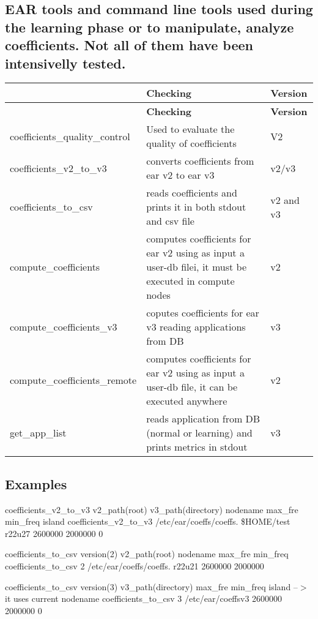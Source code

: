 \subsection*{E\+AR tools and command line tools used during the learning phase or to manipulate, analyze coefficients. Not all of them have been intensivelly tested. }

\tabulinesep=1mm
\begin{longtabu} spread 0pt [c]{*3{|X[-1]}|}
\hline
{}&{\bf Checking }&{\bf Version  }\\
\endfirsthead
\hline
\endfoot
\hline
{}&{\bf Checking }&{\bf Version  }\\
\endhead
coefficients\+\_\+quality\+\_\+control &Used to evaluate the quality of coefficients &V2 \\
coefficients\+\_\+v2\+\_\+to\+\_\+v3 &converts coefficients from ear v2 to ear v3 &v2/v3 \\
coefficients\+\_\+to\+\_\+csv &reads coefficients and prints it in both stdout and csv file &v2 and v3 \\
compute\+\_\+coefficients &computes coefficients for ear v2 using as input a user-\/db filei, it must be executed in compute nodes &v2 \\
compute\+\_\+coefficients\+\_\+v3 &coputes coefficients for ear v3 reading applications from DB &v3 \\
compute\+\_\+coefficients\+\_\+remote &computes coefficients for ear v2 using as input a user-\/db file, it can be executed anywhere &v2 \\
get\+\_\+app\+\_\+list &reads application from DB (normal or learning) and prints metrics in stdout &v3 \\
\end{longtabu}
\subsection*{Examples }


\begin{DoxyItemize}
\item coefficients\+\_\+v2\+\_\+to\+\_\+v3 v2\+\_\+path(root) v3\+\_\+path(directory) nodename max\+\_\+fre min\+\_\+freq island coefficients\+\_\+v2\+\_\+to\+\_\+v3 /etc/ear/coeffs/coeffs. \$\+H\+O\+ME/test r22u27 2600000 2000000 0
\item coefficients\+\_\+to\+\_\+csv version(2) v2\+\_\+path(root) nodename max\+\_\+fre min\+\_\+freq coefficients\+\_\+to\+\_\+csv 2 /etc/ear/coeffs/coeffs. r22u21 2600000 2000000
\item coefficients\+\_\+to\+\_\+csv version(3) v3\+\_\+path(directory) max\+\_\+fre min\+\_\+freq island --$>$ it uses current nodename coefficients\+\_\+to\+\_\+csv 3 /etc/ear/coeffsv3 2600000 2000000 0 
\end{DoxyItemize}